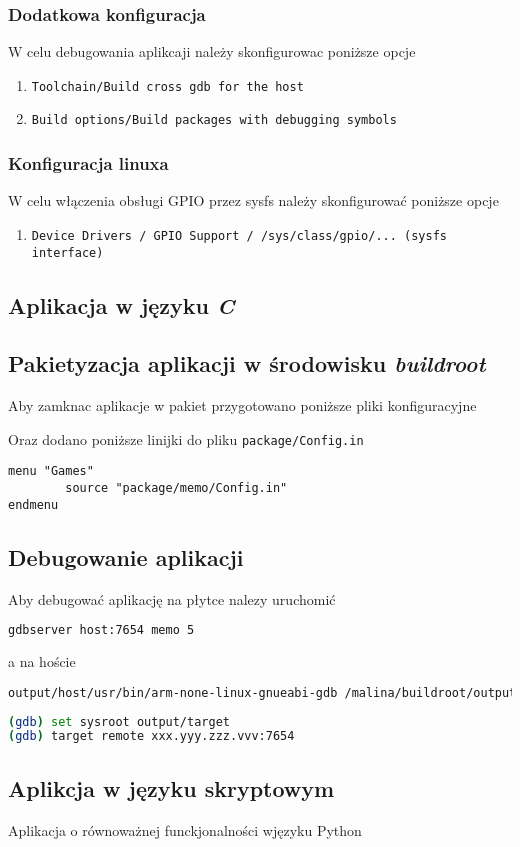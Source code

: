\subsubsection{Dodatkowa konfiguracja}
W celu debugowania aplikcaji należy skonfigurowac poniższe opcje
\begin{enumerate}
\item \texttt{Toolchain/Build cross gdb for the host}
\item \texttt{Build options/Build packages with debugging symbols}
\end{enumerate}
\subsubsection{Konfiguracja linuxa}
W celu włączenia obsługi GPIO przez sysfs należy skonfigurować poniższe opcje
\begin{enumerate}
\item \texttt{Device Drivers / GPIO Support / /sys/class/gpio/... (sysfs interface)}
\end{enumerate}


\subsection{Aplikacja w języku \emph{C}}



\subsection{Pakietyzacja aplikacji w środowisku \emph{buildroot}}
Aby zamknac aplikacje w pakiet przygotowano poniższe pliki konfiguracyjne


Oraz dodano poniższe linijki do pliku \texttt{package/Config.in}
\begin{lstlisting}
menu "Games" 
        source "package/memo/Config.in" 
endmenu
\end{lstlisting}

\subsection{Debugowanie aplikacji}
Aby debugować aplikację na płytce nalezy uruchomić 
\begin{lstlisting}[language=bash]
gdbserver host:7654 memo 5
\end{lstlisting}
a na hoście
\begin{lstlisting}[language=bash]
output/host/usr/bin/arm-none-linux-gnueabi-gdb /malina/buildroot/output/build/ledkeys-1.0/keys
\end{lstlisting}
\begin{lstlisting}[language=bash]
(gdb) set sysroot output/target
(gdb) target remote xxx.yyy.zzz.vvv:7654
\end{lstlisting}

\subsection{Aplikcja w języku skryptowym}
Aplikacja o równoważnej funckjonalności wjęzyku Python



